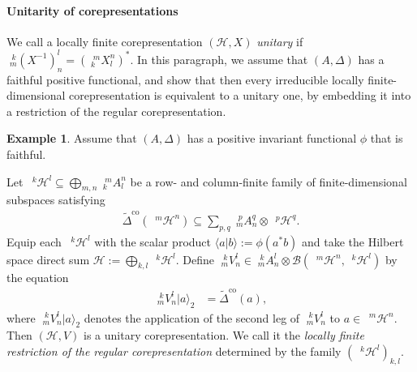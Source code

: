 \documentclass[12pt]{article}
\theoremstyle{change}
\newcommand{\co}{\mathrm{co}}
\newcommand{\Gr}[5]{\;{}^{\;#2}_{#4}#1_{#5}^{#3}}%
\newcommand{\Gru}[3]{\;{}^{\;#2}#1^{#3}}
\theoremstyle{definition}
\newtheorem{Exa}[Theorem]{Example}
\numberwithin{equation}{section}
\begin{document}
\paragraph{Unitarity of corepresentations}
We call a locally finite corepresentation $(\mathcal{H},X)$
\emph{unitary} if $\Gr{(X^{-1})}{k}{l}{m}{n}=(\Gr{X}{m}{n}{k}{l})^{*}$.  In this paragraph, we assume that
$(A,\Delta)$ has a faithful positive functional, and show that then
every irreducible locally finite-dimensional corepresentation is
equivalent to a unitary one, by embedding it into a restriction of the
regular corepresentation.
\begin{Exa} \label{exa:rep-regular}
  Assume that $(A,\Delta)$ has a positive invariant functional $\phi$
  that is faithful. 

  Let $\Gru{\mathcal{H}}{k}{l} \subseteq \bigoplus_{m,n}
  \Gr{A}{m}{n}{k}{l}$ be a row- and column-finite family of
  finite-dimensional subspaces satisfying
\begin{align*}
 \tilde  \Delta^{\co} (\Gru{\mathcal{H}}{m}{n}) \subseteq \sum_{p,q}
 \Gr{A}{p}{q}{m}{n} \otimes \Gru{\mathcal{H}}{p}{q}.
\end{align*}
Equip each $\Gru{\mathcal{H}}{k}{l}$ with the scalar product $\langle
a|b\rangle:=\phi(a^{*}b)$ and take the Hilbert space direct sum
$\mathcal{H}:=\bigoplus_{k,l} \Gru{\mathcal{H}}{k}{l}$.
Define $\Gr{V}{k}{l}{m}{n} \in \Gr{A}{k}{l}{m}{n} \otimes
\mathcal{B}(\Gru{\mathcal{H}}{m}{n},\Gru{\mathcal{H}}{k}{l})$ by the
equation
\begin{align*}
  \Gr{V}{k}{l}{m}{n}|a\rangle_{2} &= \tilde \Delta^{\co}(a),
\end{align*}
where $\Gr{V}{k}{l}{m}{n}|a\rangle_{2}$  denotes the application of
the second leg of
$\Gr{V}{k}{l}{m}{n}$  to $a \in \Gru{\mathcal{H}}{m}{n}$. Then
$(\mathcal{H},V)$ is a unitary corepresentation. We call it the 
\emph{locally finite restriction of the regular corepresentation}
determined by the family $(\Gru{\mathcal{H}}{k}{l})_{k,l}$. 
\end{Exa}
\end{document}
